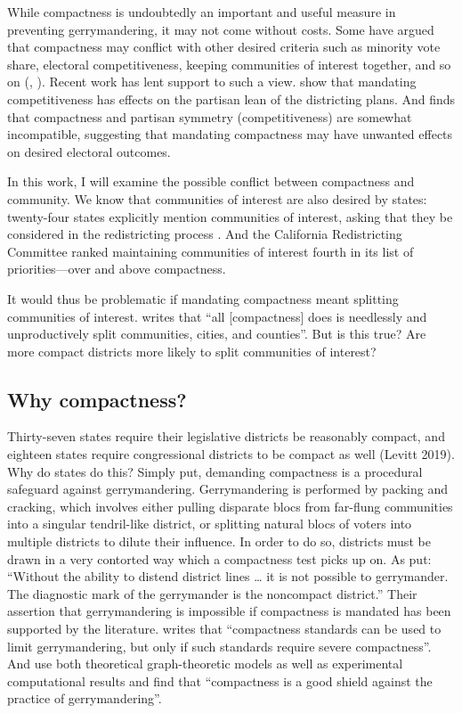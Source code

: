 \documentclass[]{article}
\begin{document}
While compactness is undoubtedly an important and useful measure in
preventing gerrymandering, it may not come without costs. Some have
argued that compactness may conflict with other desired criteria such as
minority vote share, electoral competitiveness, keeping communities of
interest together, and so on (\citep{cain1984}, \cite{karlan1989}).
Recent work has lent support to such a view. \cite{ddj2019comp} show
that mandating competitiveness has effects on the partisan lean of the
districting plans. And \cite{s2020} finds that compactness and partisan
symmetry (competitiveness) are somewhat incompatible, suggesting that
mandating compactness may have unwanted effects on desired electoral
outcomes.

In this work, I will examine the possible conflict between compactness
and community. We know that communities of interest are also desired by
states: twenty-four states explicitly mention communities of interest,
asking that they be considered in the redistricting process
\citep{brennan}. And the California Redistricting Committee ranked
maintaining communities of interest fourth in its list of
priorities---over and above compactness.

It would thus be problematic if mandating compactness meant splitting
communities of interest. \citeauthor{wolf2015} writes that ``all
{[}compactness{]} does is needlessly and unproductively split
communities, cities, and counties''. But is this true? Are more compact
districts more likely to split communities of interest?

\hypertarget{why-compactness}{%
\subsection{Why compactness?}\label{why-compactness}}

Thirty-seven states require their legislative districts be reasonably
compact, and eighteen states require congressional districts to be
compact as well (Levitt 2019). Why do states do this? Simply put,
demanding compactness is a procedural safeguard against gerrymandering.
Gerrymandering is performed by packing and cracking, which involves
either pulling disparate blocs from far-flung communities into a
singular tendril-like district, or splitting natural blocs of voters
into multiple districts to dilute their influence. In order to do so,
districts must be drawn in a very contorted way which a compactness test
picks up on. As \cite{pp1991} put: ``Without the ability to distend
district lines \ldots{} it is not possible to gerrymander. The
diagnostic mark of the gerrymander is the noncompact district.'' Their
assertion that gerrymandering is impossible if compactness is mandated
has been supported by the literature. \cite{altman1998} writes that
``compactness standards can be used to limit gerrymandering, but only if
such standards require severe compactness''. And \cite{apollonio2006}
use both theoretical graph-theoretic models as well as experimental
computational results and find that ``compactness is a good shield
against the practice of gerrymandering''.
\end{document}

